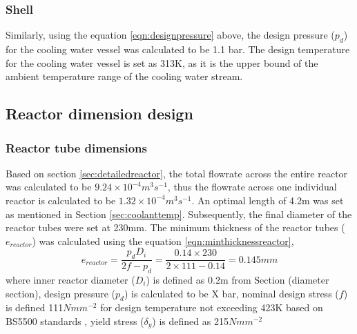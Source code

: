 \subsubsection{Shell}
Similarly, using the equation \ref{eqn:designpressure} above, the design pressure ($p_d$) for the cooling water vessel was calculated to be 1.1 bar. The design temperature for the cooling water vessel is set as 313K, as it is the upper bound of the ambient temperature range of the cooling water stream. 

\subsection{Reactor dimension design}
\label{sec:reactordimensions}

\subsubsection{Reactor tube dimensions}
\label{sec:reactortube}
Based on section \ref{sec:detailedreactor}, the total flowrate across the entire reactor was calculated to be $9.24 \times 10^{-4} m^3s^{-1}$, thus the flowrate across one individual reactor is calculated to be  $1.32 \times 10^{-4} m^3s^{-1}$. An optimal length of 4.2m was set as mentioned in Section \ref{sec:coolanttemp}. Subsequently, the final diameter of the reactor tubes were set at 230mm.  
The minimum thickness of the reactor tubes ($e_{reactor}$) was calculated using the equation \ref{eqn:minthicknessreactor},
\begin{equation}
    e_{reactor} = \frac{p_dD_i}{2f-p_d} = \frac{0.14 \times 230}{2 \times 111 - 0.14} = 0.145mm
    \label{eqn:minthicknessreactor}
\end{equation}
where inner reactor diameter ($D_i$) is defined as 0.2m from Section (diameter section), design pressure ($p_d$) is calculated to be X bar, nominal design stress ($f$) is defined 111$Nmm^{-2}$ for design temperature not exceeding 423K based on BS5500 standards , yield stress ($\delta_y$) is defined as 215$Nmm^{-2}$ \cite{noauthor_unfired_nodate}


